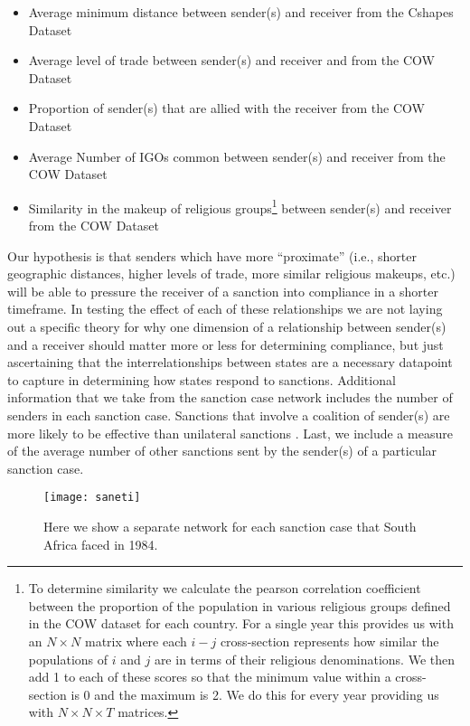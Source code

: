 \begin{itemize}
	\item Average minimum distance between sender(s) and receiver from the Cshapes Dataset \citep{weidmann2010geography}
	\item Average level of trade between sender(s) and receiver and from the COW Dataset \citep{barbieri2009trading}
	\item Proportion of sender(s) that are allied with the receiver from the COW Dataset \citep{gibler2009international}
	\item Average Number of IGOs common between sender(s) and receiver from the COW Dataset \citep{pevehouse2004correlates}
	\item Similarity in the makeup of religious groups\footnote{To determine similarity we calculate the pearson correlation coefficient between the proportion of the population in various religious groups defined in the COW dataset for each country. For a single year this provides us with an $N \times N$ matrix where each $i-j$ cross-section represents how similar the populations of $i$ and $j$ are in terms of their religious denominations. We then add 1 to each of these scores so that the minimum value within a cross-section is 0 and the maximum is 2. We do this for every year providing us with $N \times N \times T$ matrices.} between sender(s) and receiver from the COW Dataset \citep{maoz2013world}
\end{itemize}

Our hypothesis is that senders which have more ``proximate'' (i.e., shorter geographic distances, higher levels of trade, more similar religious makeups, etc.) will be able to pressure the receiver of a sanction into compliance in a shorter timeframe. In testing the effect of each of these relationships we are not laying out a specific theory for why one dimension of a relationship between sender(s) and a receiver should matter more or less for determining compliance, but just ascertaining that the interrelationships between states are a necessary datapoint to capture in determining how states respond to sanctions. Additional information that we take from the sanction case network includes the number of senders in each sanction case. Sanctions that involve a coalition of sender(s) are more likely to be effective than unilateral sanctions \citep{morgan2009threat}. Last, we include a measure of the average number of other sanctions sent by the sender(s) of a particular sanction case. 

\begin{figure}[ht]
	\centering
	\texttt{[image: saneti]}
	\caption{Here we show a separate network for each sanction case that South Africa faced in 1984.}
	\label{fig:saneti}
\end{figure}
\FloatBarrier

